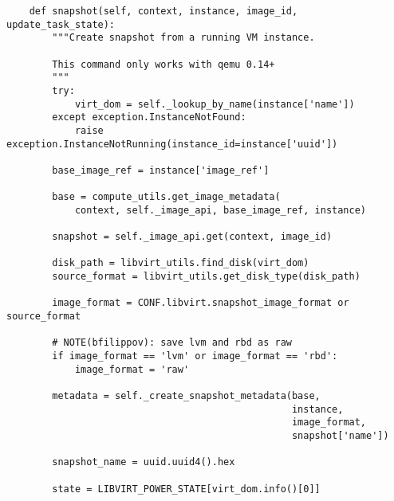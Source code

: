 \documentclass[a4paper,left=1.5cm,right=1.5cm,11pt]{article}
\begin{document}
    \begin{lstlisting}
    def snapshot(self, context, instance, image_id, update_task_state):
        """Create snapshot from a running VM instance.

        This command only works with qemu 0.14+
        """
        try:
            virt_dom = self._lookup_by_name(instance['name'])
        except exception.InstanceNotFound:
            raise exception.InstanceNotRunning(instance_id=instance['uuid'])

        base_image_ref = instance['image_ref']

        base = compute_utils.get_image_metadata(
            context, self._image_api, base_image_ref, instance)

        snapshot = self._image_api.get(context, image_id)

        disk_path = libvirt_utils.find_disk(virt_dom)
        source_format = libvirt_utils.get_disk_type(disk_path)

        image_format = CONF.libvirt.snapshot_image_format or source_format

        # NOTE(bfilippov): save lvm and rbd as raw
        if image_format == 'lvm' or image_format == 'rbd':
            image_format = 'raw'

        metadata = self._create_snapshot_metadata(base,
                                                  instance,
                                                  image_format,
                                                  snapshot['name'])

        snapshot_name = uuid.uuid4().hex

        state = LIBVIRT_POWER_STATE[virt_dom.info()[0]]


\end{lstlisting}
\end{document}
